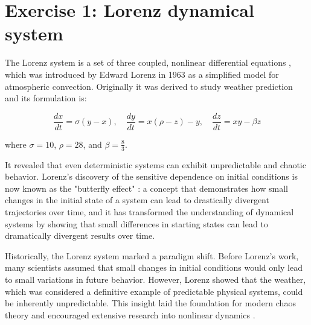 

\section{Exercise 1: Lorenz dynamical system}

The Lorenz system is a set of three coupled, nonlinear differential equations \cite{1963JAtS...20..130L}, which was introduced by Edward Lorenz in 1963 as a simplified model for atmospheric convection. Originally it was derived to study weather prediction and its formulation is:




\begin{equation}\label{eq:lorenz_horizontal}
\frac{dx}{dt} = \sigma(y - x), \quad
\frac{dy}{dt} = x(\rho - z) - y, \quad
\frac{dz}{dt} = xy - \beta z
\end{equation}


\begin{center}
where $\sigma = 10$, $\rho = 28$, and $\beta = \frac{8}{3}$.
\end{center}

It revealed that even deterministic systems can exhibit unpredictable and chaotic behavior. Lorenz's discovery of the sensitive dependence on initial conditions is now known as the "butterfly effect" \cite{apsLorenz2003}: a concept that demonstrates how small changes in the initial state of a system can lead to drastically divergent trajectories over time, and it has transformed the understanding of dynamical systems by showing that small differences in starting states can lead to dramatically divergent results over time.

Historically, the Lorenz system marked a paradigm shift. Before Lorenz’s work, many scientists assumed that small changes in initial conditions would only lead to small variations in future behavior. However, Lorenz showed that the weather, which was considered a definitive example of predictable physical systems, could be inherently unpredictable. This insight laid the foundation for modern chaos theory and encouraged extensive research into nonlinear dynamics \cite{apsLorenz2003}.

